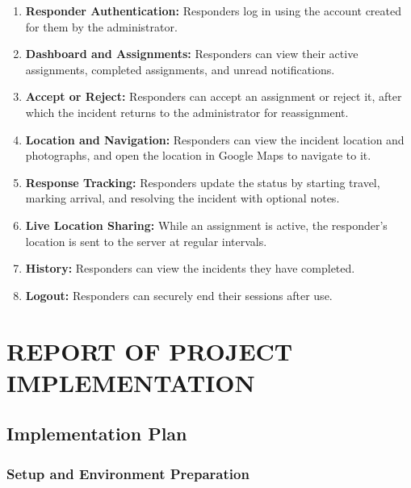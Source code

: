 \documentclass[a4paper,12pt]{report}
\begin{document}
	\begin{enumerate}
		\item \textbf{Responder Authentication:} Responders log in using the account created for them by the administrator.
		
		\item \textbf{Dashboard and Assignments:} Responders can view their active assignments, completed assignments, and unread notifications.
		
		\item \textbf{Accept or Reject:} Responders can accept an assignment or reject it, after which the incident returns to the administrator for reassignment.
		
		\item \textbf{Location and Navigation:} Responders can view the incident location and photographs, and open the location in Google Maps to navigate to it.
		
		\item \textbf{Response Tracking:} Responders update the status by starting travel, marking arrival, and resolving the incident with optional notes.
		
		\item \textbf{Live Location Sharing:} While an assignment is active, the responder's location is sent to the server at regular intervals.
		
		\item \textbf{History:} Responders can view the incidents they have completed.
		
		\item \textbf{Logout:} Responders can securely end their sessions after use.
	\end{enumerate}
	
	\newpage
	
	\chapter{REPORT OF PROJECT IMPLEMENTATION}
	
	\section{Implementation Plan}
	
	\subsection{Setup and Environment Preparation}
	
\end{document}
